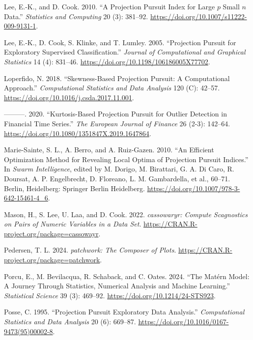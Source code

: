 \documentclass[
  12pt,
]{interact}
\newlength{\cslhangindent}
\newenvironment{CSLReferences}[2] %
 {\begin{list}{}{%
  \setlength{\itemindent}{0pt}
  \setlength{\leftmargin}{0pt}
  \setlength{\parsep}{0pt}
  \ifodd #1
   \setlength{\leftmargin}{\cslhangindent}
   \setlength{\itemindent}{-1\cslhangindent}
  \fi
  \setlength{\itemsep}{#2\baselineskip}}}
 {\end{list}}
\theoremstyle{plain}
\begin{document}
\begin{CSLReferences}{1}{0}
Lee, E.-K., and D. Cook. 2010. {``A Projection Pursuit Index for Large
\(p\) Small \(n\) Data.''} \emph{Statistics and Computing} 20 (3):
381--92. \url{https://doi.org/10.1007/s11222-009-9131-1}.

Lee, E.-K., D. Cook, S. Klinke, and T. Lumley. 2005. {``Projection
Pursuit for Exploratory Supervised Classification.''} \emph{Journal of
Computational and Graphical Statistics} 14 (4): 831--46.
\url{https://doi.org/10.1198/106186005X77702}.

Loperfido, N. 2018. {``Skewness-Based Projection Pursuit: A
Computational Approach.''} \emph{Computational Statistics and Data
Analysis} 120 (C): 42--57.
\url{https://doi.org/10.1016/j.csda.2017.11.001}.

---------. 2020. {``Kurtosis-Based Projection Pursuit for Outlier
Detection in Financial Time Series.''} \emph{The European Journal of
Finance} 26 (2-3): 142--64.
\url{https://doi.org/10.1080/1351847X.2019.1647864}.

Marie-Sainte, S. L., A. Berro, and A. Ruiz-Gazen. 2010. {``An Efficient
Optimization Method for Revealing Local Optima of Projection Pursuit
Indices.''} In \emph{Swarm Intelligence}, edited by M. Dorigo, M.
Birattari, G. A. Di Caro, R. Doursat, A. P. Engelbrecht, D. Floreano, L.
M. Gambardella, et al., 60--71. Berlin, Heidelberg: Springer Berlin
Heidelberg. \url{https://doi.org/10.1007/978-3-642-15461-4_6}.

Mason, H., S. Lee, U. Laa, and D. Cook. 2022. \emph{{c}assowaryr:
Compute Scagnostics on Pairs of Numeric Variables in a Data Set}.
\url{https://CRAN.R-project.org/package=cassowayr}.

Pedersen, T. L. 2024. \emph{{p}atchwork: The Composer of Plots}.
\url{https://CRAN.R-project.org/package=patchwork}.

Porcu, E., M. Bevilacqua, R. Schaback, and C. Oates. 2024. {``The
{M}atérn Model: A Journey Through Statistics, Numerical Analysis and
Machine Learning.''} \emph{Statistical Science} 39 (3): 469--92.
\url{https://doi.org/10.1214/24-STS923}.

Posse, C. 1995. {``Projection Pursuit Exploratory Data Analysis.''}
\emph{Computational Statistics and Data Analysis} 20 (6): 669--87.
\url{https://doi.org/10.1016/0167-9473(95)00002-8}.


\end{CSLReferences}
\end{document}
